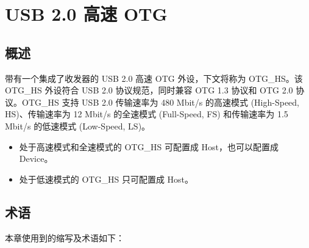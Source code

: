 \documentclass[main\_\_CN.tex]{subfiles}
\begin{document}

\ifglobal
\else
    \listoftodos
    {\let\clearpage\relax \listofdonetodos}
    \tableofcontents
\fi





\hypertarget{usbotghs}{}
\chapter{USB 2.0 高速 OTG}
\label{mod:usbotghs}

\section{概述}
\chipname{} 带有一个集成了收发器的 USB 2.0 高速 OTG 外设，下文将称为 OTG\_HS。该 OTG\_HS 外设符合 USB 2.0 协议规范，同时兼容 OTG 1.3 协议和 OTG 2.0 协议。OTG\_HS 支持 USB 2.0 传输速率为 480 Mbit/s 的高速模式 (High-Speed, HS)、传输速率为 12 Mbit/s 的全速模式 (Full-Speed, FS) 和传输速率为 1.5 Mbit/s 的低速模式 (Low-Speed, LS)。
\begin{itemize}
    \item 处于高速模式和全速模式的 OTG\_HS 可配置成 Host，也可以配置成 Device。
    \item 处于低速模式的 OTG\_HS 只可配置成 Host。
\end{itemize}

\section{术语}

本章使用到的缩写及术语如下：
\end{document}
